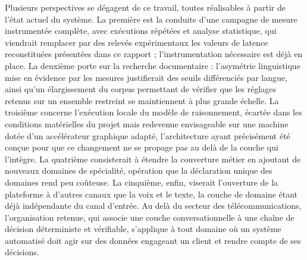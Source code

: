 Plusieurs perspectives se dégagent de ce travail, toutes réalisables à partir de l'état actuel du système. La première est la conduite d'une campagne de mesure instrumentée complète, avec exécutions répétées et analyse statistique, qui viendrait remplacer par des relevés expérimentaux les valeurs de latence reconstituées présentées dans ce rapport ; l'instrumentation nécessaire est déjà en place. La deuxième porte sur la recherche documentaire : l'asymétrie linguistique mise en évidence par les mesures justifierait des seuils différenciés par langue, ainsi qu'un élargissement du corpus permettant de vérifier que les réglages retenus sur un ensemble restreint se maintiennent à plus grande échelle. La troisième concerne l'exécution locale du modèle de raisonnement, écartée dans les conditions matérielles du projet mais redevenue envisageable sur une machine dotée d'un accélérateur graphique adapté, l'architecture ayant précisément été conçue pour que ce changement ne se propage pas au delà de la couche qui l'intègre. La quatrième consisterait à étendre la couverture métier en ajoutant de nouveaux domaines de spécialité, opération que la déclaration unique des domaines rend peu coûteuse. La cinquième, enfin, viserait l'ouverture de la plateforme à d'autres canaux que la voix et le texte, la couche de domaine étant déjà indépendante du canal d'entrée. Au delà du secteur des télécommunications, l'organisation retenue, qui associe une couche conversationnelle à une chaîne de décision déterministe et vérifiable, s'applique à tout domaine où un système automatisé doit agir sur des données engageant un client et rendre compte de ses décisions.
